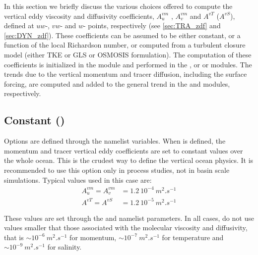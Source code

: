 \documentclass[../main/NEMO_manual]{subfiles}
\begin{document}
In this section we briefly discuss the various choices offered to compute the vertical eddy viscosity and
diffusivity coefficients, $A_u^{vm}$ , $A_v^{vm}$ and $A^{vT}$ ($A^{vS}$), defined at $uw$-, $vw$- and $w$- points,
respectively (see \autoref{sec:TRA_zdf} and \autoref{sec:DYN_zdf}).
These coefficients can be assumed to be either constant, or a function of the local Richardson number,
or computed from a turbulent closure model (either TKE or GLS or OSMOSIS formulation).
The computation of these coefficients is initialized in the  module and performed in
the ,  or  or  modules.
The trends due to the vertical momentum and tracer diffusion, including the surface forcing,
are computed and added to the general trend in the  and  modules, respectively.

\begin{listing}
  \caption{}
  \label{lst:namzdf}
\end{listing}

\subsection[Constant (\forcode{ln_zdfcst})]{Constant (\protect{})}
\label{subsec:ZDF_cst}

Options are defined through the  namelist variables.
When  is defined, the momentum and tracer vertical eddy coefficients are set to
constant values over the whole ocean.
This is the crudest way to define the vertical ocean physics.
It is recommended to use this option only in process studies, not in basin scale simulations.
Typical values used in this case are:
\begin{align*}
  A_u^{vm} = A_v^{vm} &= 1.2\ 10^{-4}~m^2.s^{-1} 	\\
  A^{vT} = A^{vS} &= 1.2\ 10^{-5}~m^2.s^{-1}
\end{align*}

These values are set through the  and  namelist parameters.
In all cases, do not use values smaller that those associated with the molecular viscosity and diffusivity,
that is $\sim10^{-6}~m^2.s^{-1}$ for momentum, $\sim10^{-7}~m^2.s^{-1}$ for temperature and
$\sim10^{-9}~m^2.s^{-1}$ for salinity.
\end{document}
